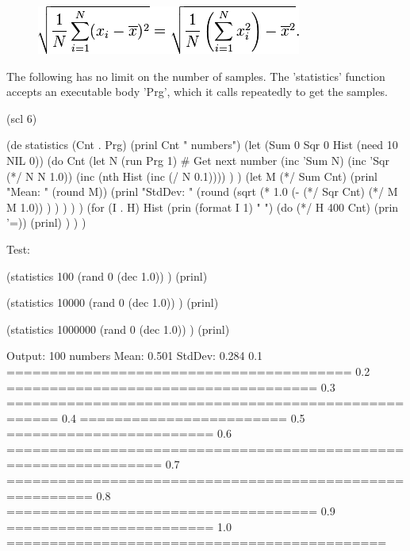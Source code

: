 \begin{itemize}
\begin{figure}[H]
\centering
\includegraphics[scale=.6]{graphics/1a6a1cf8fdc67e4bd31e60a052c3c9ae.png}
\end{figure}


\begin{wideverbatim}

The following has no limit on the number of samples. The 'statistics' function
accepts an executable body 'Prg', which it calls repeatedly to get the samples.

(scl 6)

(de statistics (Cnt . Prg)
   (prinl Cnt " numbers")
   (let (Sum 0  Sqr 0  Hist (need 10 NIL 0))
      (do Cnt
         (let N (run Prg 1)  # Get next number
            (inc 'Sum N)
            (inc 'Sqr (*/ N N 1.0))
            (inc (nth Hist (inc (/ N 0.1)))) ) )
      (let M (*/ Sum Cnt)
         (prinl "Mean:   " (round M))
         (prinl "StdDev: "
            (round
               (sqrt
                  (* 1.0
                     (- (*/ Sqr Cnt) (*/ M M 1.0)) ) ) ) ) )
      (for (I . H) Hist
         (prin (format I 1) " ")
         (do (*/ H 400 Cnt) (prin '=))
         (prinl) ) ) )

Test:

(statistics 100
   (rand 0 (dec 1.0)) )
(prinl)

(statistics 10000
   (rand 0 (dec 1.0)) )
(prinl)

(statistics 1000000
   (rand 0 (dec 1.0)) )
(prinl)


\end{wideverbatim}

\begin{wideverbatim}


Output:
100 numbers
Mean:   0.501
StdDev: 0.284
0.1 ========================================
0.2 ====================================
0.3 ====================================================
0.4 ========================
0.5 ========================
0.6 ================================================================
0.7 ========================================================
0.8 ====================================
0.9 ========================
1.0 ============================================


\end{wideverbatim}
\end{itemize}
